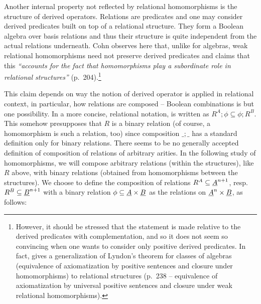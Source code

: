 \documentclass[10pt]{article}
\begin{document}
Another internal property not reflected by relational homomorphisms is
the structure of derived operators. Relations are predicates and one
may consider derived predicates built on top of a relational
structure. They form a Boolean algebra over basis relations and thus
their structure is quite independent from the actual relations
underneath.
%
Cohn \cite{Cohn} observes here that, unlike for algebras, weak
relational homomorphisms need not preserve derived predicates and
claims that this {\em ``accounts for the fact that homomorphisms play
a subordinate role in relational structures''} (p.~204).\footnote{However, it
should be stressed that the statement is made relative to the derived
predicates with complementation, and so it does not seem so convincing
when one wants to consider only positive derived predicates. In fact,
\cite{Cohn} gives a generalization of Lyndon's theorem for classes of
algebras (equivalence of axiomatization by positive sentences and
closure under homomorphisms) to relational structures (p.~238 --
equivalence of axiomatization by universal positive sentences and
closure under weak relational homomorphisms).}

This claim depends on way the notion of derived operator is applied in
relational context, in particular, how relations are composed --
Boolean combinations is but one possibility.
In a more concise, relational notation,  is written as
$R^A;\phi\subseteq \phi;R^B$. This somehow presupposes that $R$ is a
binary relation (of course, a homomorphism is such a relation,
too) since composition $\_;\_$ has a standard definition only for
binary relations.  There seems to be no generally accepted definition
of composition of relations of arbitrary arities. In the following
study of homomorphisms, we will compose arbitrary relations (within
the structures), like $R$ above, with binary relations (obtained from
homomorphisms between the structures).  We choose to define the
composition of relations $R^A\subseteq \underline {A}^{n+1}$, resp.
$R^B\subseteq \underline {B}^{n+1}$ with a binary relation $\phi\subseteq
\underline {A}\times\underline {B}$ as the relations on $\underline {A}^n\times\underline {B}$, as follows:
\end{document}
